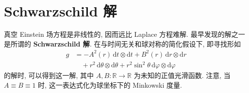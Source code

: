 \section{Schwarzschild 解}\label{sec:schwarzschild-solution}

真空 Einstein 场方程是非线性的, 因而远比 Laplace 方程难解. 最早发现的解之一是所谓的 \textbf{Schwarzschild 解}. 在与时间无关和球对称的简化假设下, 即寻找形如
\begin{align*}
  g&=-A^2(r)\,\mathrm{d}t\otimes\mathrm{d}t+B^2(r)\,\mathrm{d}r\otimes\mathrm{d}r\\
   &\quad+r^2\,\mathrm{d}\theta\otimes\mathrm{d}\theta
         +r^2\sin^2\theta\,\mathrm{d}\varphi\otimes\mathrm{d}\varphi
\end{align*}
的解时, 可以得到这一解, 其中 $A,B:\mathbb{R}\to\mathbb{R}$ 为未知的正值光滑函数. 注意, 当 $A\equiv B\equiv1$ 时, 这一表达式化为球坐标下的 Minkowski 度量.


